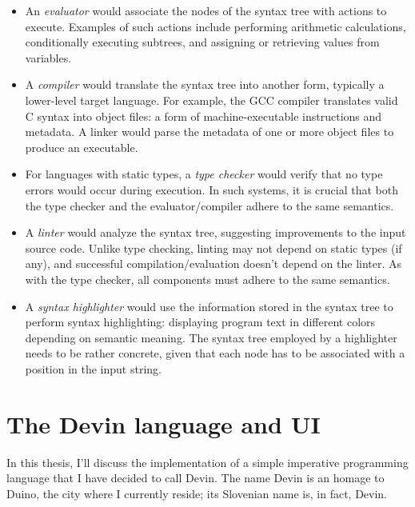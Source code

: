 \documentclass[UdineBachThesis,american,11pt]{PhdThesis}
\begin{document}
  \begin{itemize}
    \item An \emph{evaluator} would associate the nodes of the syntax tree with
    actions to execute. Examples of such actions include performing arithmetic
    calculations, conditionally executing subtrees, and assigning or retrieving
    values from variables.

    \item A \emph{compiler} would translate the syntax tree into another form,
    typically a lower-level target language. For example, the GCC compiler
    translates valid C syntax into object files: a form of machine-executable
    instructions and metadata. A linker would parse the metadata of one or more
    object files to produce an executable.

    \item For languages with static types, a \emph{type checker} would verify
    that no type errors would occur during execution. In such systems, it is
    crucial that both the type checker and the evaluator/compiler adhere to the
    same semantics.

    \item A \emph{linter} would analyze the syntax tree, suggesting improvements
    to the input source code. Unlike type checking, linting may not depend on
    static types (if any), and successful compilation/evaluation doesn't depend
    on the linter. As with the type checker, all components must adhere to the
    same semantics.

    \item A \emph{syntax highlighter} would use the information stored in the
    syntax tree to perform syntax highlighting: displaying program text in
    different colors depending on semantic meaning. The syntax tree employed by
    a highlighter needs to be rather concrete, given that each node has to be
    associated with a position in the input string.
  \end{itemize}

  \newpage
  \thispagestyle{empty}

  \chapter{The Devin language and UI}

  In this thesis, I'll discuss the implementation of a simple imperative
  programming language that I have decided to call Devin. The name Devin is an
  homage to Duino, the city where I currently reside; its Slovenian name is, in
  fact, Devin.
\end{document}
